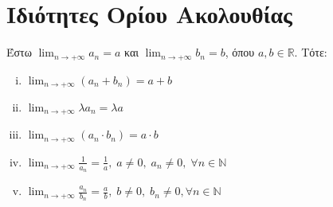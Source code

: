 
\section{Ιδιότητες Ορίου Ακολουθίας}

\begin{mybox3}
  \begin{prop}
    Έστω $ \lim_{n \to +\infty} a_{n} = a$ και $ \lim_{n \to +\infty} 
    b_{n} = b $, όπου $ a,b \in \mathbb{R} $. Τότε:
    \begin{enumerate}[i)]
      \item $ \lim_{n \to +\infty} (a_{n} + b_{n}) = a+b $
      \item $ \lim_{n \to +\infty} \lambda a_{n}= \lambda a $
      \item $ \lim_{n \to +\infty} (a_{n}\cdot b_{n}) = a\cdot b $
      \item $ \lim_{n \to +\infty} \frac{1}{a_{n}} = \frac{1}{a},
        \; a \neq 0, \; a_{n} \neq 0, \; \forall n \in \mathbb{N}  $
      \item $ \lim_{n \to +\infty} \frac{a_{n}}{b_{n}} = \frac{a}{b},
        \; b \neq 0, \; b_{n} \neq 0, \forall n \in \mathbb{N} $
    \end{enumerate}
  \end{prop}
\end{mybox3}
